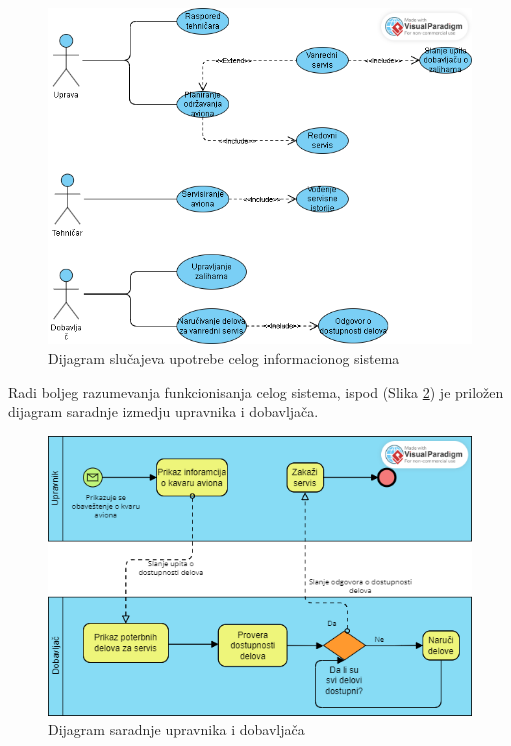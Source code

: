 \documentclass[a4paper]{article}
\begin{document}
\begin{figure}[H]
\begin{center}
\includegraphics[scale=0.55]{Dijagrami/Dijagrami_slucajeva_upotrebe/Dijagram_slučajeva_upotrebe_celog_informacionog_sistema.png}
\end{center}
\caption{Dijagram slučajeva upotrebe celog informacionog sistema}
\label{fig:ceo_sistem}
\end{figure}

Radi boljeg razumevanja funkcionisanja celog sistema, ispod (Slika \ref{fig:bpmn_dijargram_saradnje}) je priložen dijagram saradnje izmedju upravnika i dobavljača.

\begin{figure}[H]
\begin{center}
\includegraphics[scale=0.5]{Dijagrami/BPMN_Dijagrami/Dijagram_saradnje_upravnik_dobavljac.png}
\end{center}
\caption{Dijagram saradnje upravnika i dobavljača}
\label{fig:bpmn_dijargram_saradnje}
\end{figure}
\end{document}
